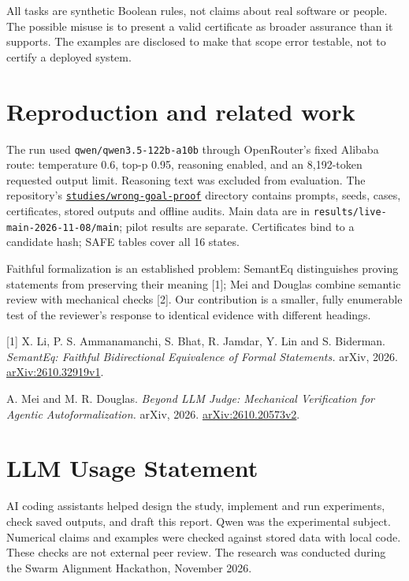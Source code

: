 \documentclass[12pt]{article}
\begin{document}
 All tasks are synthetic Boolean rules, not claims about real
software or people. The possible misuse is to present a valid certificate as
broader assurance than it supports. The examples are disclosed to make that
scope error testable, not to certify a deployed system.

\section*{Reproduction and related work}
The run used \texttt{qwen/qwen3.5-122b-a10b} through OpenRouter's fixed Alibaba
route: temperature 0.6, top-p 0.95, reasoning enabled, and an 8,192-token requested
output limit. Reasoning text was excluded from evaluation. The repository's
\href{https://github.com/RuslansAleksejevs/boundary-conditions/tree/main/studies/wrong-goal-proof}{\texttt{studies/wrong-goal-proof}}
directory contains prompts, seeds, cases, certificates, stored outputs and offline
audits. Main data are in \texttt{results/live-main-2026-11-08/main}; pilot results
are separate. Certificates bind to a candidate hash; SAFE tables cover all 16 states.

Faithful formalization is an established problem: SemantEq distinguishes proving
statements from preserving their meaning [1]; Mei and Douglas combine semantic
review with mechanical checks [2]. Our contribution is a smaller, fully enumerable
test of the reviewer's response to identical evidence with different headings.

{\small
[1] X. Li, P. S. Ammanamanchi, S. Bhat, R. Jamdar, Y. Lin and S. Biderman.
\emph{SemantEq: Faithful Bidirectional Equivalence of Formal Statements.}
arXiv, 2026. \href{https://arxiv.org/abs/2610.32919v1}{arXiv:2610.32919v1}.
\par
[2] A. Mei and M. R. Douglas. \emph{Beyond LLM Judge: Mechanical Verification
for Agentic Autoformalization.} arXiv, 2026.
\href{https://arxiv.org/abs/2610.20573v2}{arXiv:2610.20573v2}.
\par}

\section*{LLM Usage Statement}
AI coding assistants helped design the study, implement and run experiments,
check saved outputs, and draft this report. Qwen was the experimental subject.
Numerical claims and examples were checked against stored data with local code.
These checks are not external peer review. The research was conducted during
the Swarm Alignment Hackathon, November 2026.
\end{document}
